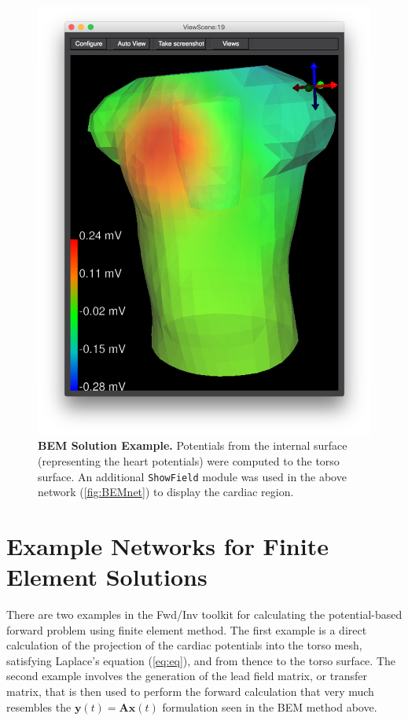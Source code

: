 \begin{figure}[H]
\begin{center}
\includegraphics[width=.9\textwidth]{ECGToolkitGuide_figures/BEMSolution.png}
\caption{{\bf BEM Solution Example.} Potentials from the internal surface (representing the heart potentials) were computed to the torso surface. An additional {\tt ShowField} module was used in the above network (\autoref{fig:BEMnet}) to display the cardiac region.}
\label{fig:BEMsol}
\end{center}
\vspace{-.25in}
\end{figure}

\newpage

\section{Example Networks for Finite Element Solutions}

There are two examples in the Fwd/Inv toolkit for calculating the potential-based forward problem using finite element method. The first example is a direct calculation of the projection of the cardiac potentials into the torso mesh, satisfying Laplace's equation (\autoref{eq:eq}), and from thence to the torso surface.
The second example involves the generation of the lead field matrix, or transfer matrix, that is then used  to perform the forward calculation that very much resembles the $\mathbf{y}(t) = \mathbf{A}\mathbf{x}(t)$ formulation seen in the BEM method above.

